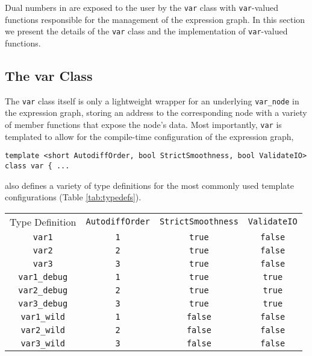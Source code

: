 Dual numbers in \nomad are exposed to the user by the \verb|var|
class with \verb|var|-valued functions responsible for the management
of the expression graph.  In this section we present the details of
the \verb|var| class and the implementation of \verb|var|-valued functions.

\subsection{The var Class}

The \verb|var| class itself is only a lightweight wrapper for an underlying 
\verb|var_node| in the expression graph, storing an address to the 
corresponding node with a variety of member functions that expose the 
node's data.  Most importantly, \verb|var| is templated to allow for the 
compile-time configuration of the expression graph,
%
\begin{verbatim}
template <short AutodiffOrder, bool StrictSmoothness, bool ValidateIO>
class var { ...
\end{verbatim}
%
\nomad also defines a variety of type definitions for the most commonly
used template configurations (Table \ref{tab:typedefs}).

\begin{table*}[t!]
	\centering
	\renewcommand{\arraystretch}{2}
	\begin{tabular}{cccc}
	\rowcolor[gray]{0.9} Type Definition & \verb|AutodiffOrder|
	& \verb|StrictSmoothness| & \verb|ValidateIO| \\
	\verb|var1| & \verb|1| & \verb|true| & \verb|false| \\
	\rowcolor[gray]{0.9} \verb|var2| & \verb|2| & \verb|true| & \verb|false| \\
	\verb|var3| & \verb|3| & \verb|true| & \verb|false| \\
	\rowcolor[gray]{0.9} \verb|var1_debug| & \verb|1| & \verb|true| & \verb|true| \\
	\verb|var2_debug| & \verb|2| & \verb|true| & \verb|true| \\
	\rowcolor[gray]{0.9} \verb|var3_debug| & \verb|3| & \verb|true| & \verb|true| \\
	\verb|var1_wild| & \verb|1| & \verb|false| & \verb|false| \\
	\rowcolor[gray]{0.9} \verb|var2_wild| & \verb|2| & \verb|false| & \verb|false| \\
	\verb|var3_wild| & \verb|3| & \verb|false| & \verb|false| \\
	\end{tabular}
	\caption{The \texttt{nomad} namespace includes helpful type definitions for 
	the most common \texttt{var} configurations.}
	\label{tab:typedefs}
\end{table*}


